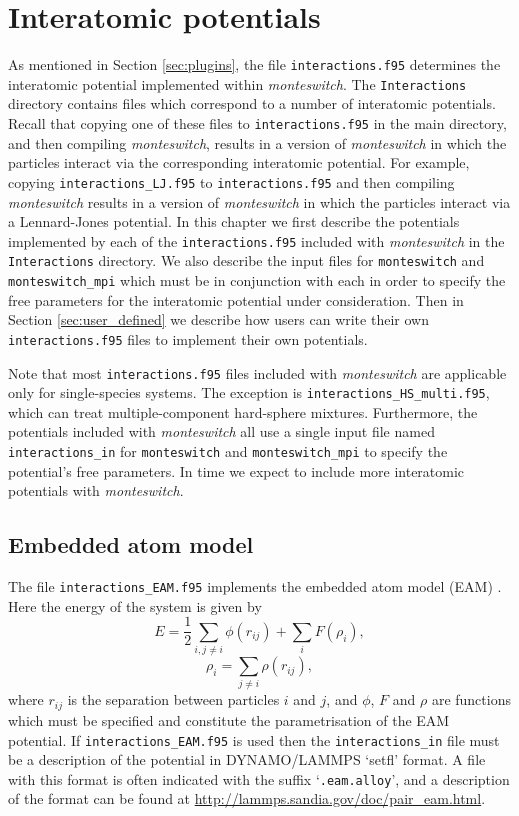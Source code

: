 \documentclass{report}
\begin{document}
\chapter{Interatomic potentials}\label{chapter:interactions}
As mentioned in Section \ref{sec:plugins}, the file \texttt{interactions.f95} determines the interatomic potential implemented within
\emph{monteswitch}. The \texttt{Interactions} directory contains files which correspond to a number of interatomic potentials. Recall that
copying one of these files to \texttt{interactions.f95} in the main directory, and then compiling \emph{monteswitch}, results in a version 
of \emph{monteswitch} in which the particles interact via the corresponding interatomic potential. 
For example, copying \texttt{interactions\_LJ.f95} to \texttt{interactions.f95} and then compiling \emph{monteswitch} results in a version 
of \emph{monteswitch} in which the particles interact via a Lennard-Jones potential. 
In this chapter we first describe the potentials implemented by each of the \texttt{interactions.f95} included with \emph{monteswitch} in the
\texttt{Interactions} directory. We also describe the input files for \texttt{monteswitch} and \texttt{monteswitch\_mpi} which must be
in conjunction with each in order to specify the free parameters for the interatomic potential under consideration.
Then in Section \ref{sec:user_defined} we describe how users can write their own \texttt{interactions.f95} files to implement their own potentials.

Note that most \texttt{interactions.f95} files included with \emph{monteswitch} are applicable only for single-species systems. The exception is 
\texttt{interactions\_HS\_multi.f95}, which can treat multiple-component hard-sphere mixtures.
Furthermore, the potentials included with \emph{monteswitch} all use a single input file named \texttt{interactions\_in} for \texttt{monteswitch} 
and \texttt{monteswitch\_mpi} to specify the potential's free parameters. In time we expect to include more interatomic potentials with \emph{monteswitch}. 

\section{Embedded atom model}
The file \texttt{interactions\_EAM.f95} implements the embedded atom model (EAM) \cite{Daw_1984}. Here the energy of the system 
is given by
\begin{equation}
E = \frac{1}{2}\sum_{i,j\neq i}\phi(r_{ij}) + \sum_iF(\rho_i),
\end{equation}
\begin{equation}
\rho_i=\sum_{j\neq i}\rho(r_{ij}),
\end{equation}
where $r_{ij}$ is the separation between particles $i$ and $j$, and $\phi$, $F$ and $\rho$ are functions which must be specified
and constitute the parametrisation of the EAM potential. If \texttt{interactions\_EAM.f95} is used then the \texttt{interactions\_in}
file must be a description of the potential in DYNAMO/LAMMPS `setfl' format. A file with this format is often indicated with the 
suffix `\texttt{.eam.alloy}', and a description of the format can be found at \url{http://lammps.sandia.gov/doc/pair\_eam.html}. 
\end{document}
